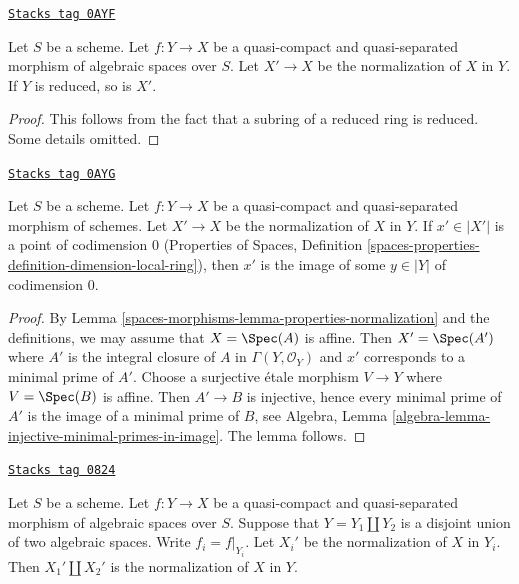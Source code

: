 \begin{lemma}
\label{spaces-morphisms-lemma-normalization-in-reduced}
\href{https://stacks.math.columbia.edu/tag/0AYF}{\texttt{Stacks tag 0AYF}}

Let $S$ be a scheme. Let $f : Y \to X$ be a quasi-compact and
quasi-separated morphism of algebraic spaces over $S$.
Let $X' \to X$ be the normalization of $X$ in $Y$.
If $Y$ is reduced, so is $X'$.
\end{lemma}

\begin{proof}
This follows from the fact that a subring of a reduced ring is reduced.
Some details omitted.
\end{proof}

\begin{lemma}
\label{spaces-morphisms-lemma-normalization-generic}
\href{https://stacks.math.columbia.edu/tag/0AYG}{\texttt{Stacks tag 0AYG}}

Let $S$ be a scheme. Let $f : Y \to X$ be a quasi-compact and quasi-separated
morphism of schemes. Let $X' \to X$ be the normalization of $X$ in $Y$.
If $x' \in |X'|$ is a point of codimension $0$
(Properties of Spaces, Definition
\ref{spaces-properties-definition-dimension-local-ring}), then
$x'$ is the image of some $y \in |Y|$ of codimension $0$.
\end{lemma}

\begin{proof}
By Lemma \ref{spaces-morphisms-lemma-properties-normalization} and the definitions, we may
assume that $X = \Spec(A)$ is affine. Then $X' = \Spec(A')$ where $A'$ is
the integral closure of $A$ in $\Gamma(Y, \mathcal{O}_Y)$ and $x'$ corresponds
to a minimal prime of $A'$. Choose a surjective \'etale
morphism $V \to Y$ where $V = \Spec(B)$ is affine. Then
$A' \to B$ is injective, hence every minimal prime of $A'$ is
the image of a minimal prime of $B$, see
Algebra, Lemma \ref{algebra-lemma-injective-minimal-primes-in-image}.
The lemma follows.
\end{proof}

\begin{lemma}
\label{spaces-morphisms-lemma-normalization-in-disjoint-union}
\href{https://stacks.math.columbia.edu/tag/0824}{\texttt{Stacks tag 0824}}

Let $S$ be a scheme.
Let $f : Y \to X$ be a quasi-compact and quasi-separated morphism of
algebraic spaces over $S$.
Suppose that $Y = Y_1 \amalg Y_2$ is a disjoint union of two
algebraic spaces.
Write $f_i = f|_{Y_i}$. Let $X_i'$ be the normalization of $X$ in $Y_i$.
Then $X_1' \amalg X_2'$ is the normalization of $X$ in $Y$.
\end{lemma}

